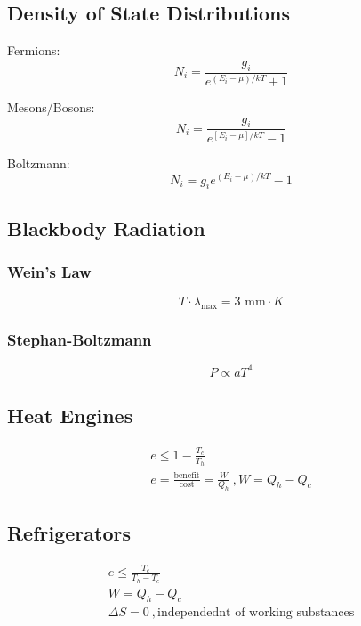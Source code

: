 \documentclass[10pt,a4paper]{article}
\begin{document}
\subsection{Density of State Distributions}
Fermions:
\begin{equation}
    N_i = \frac{g_i}{e^{(E_i - \mu)/kT}+1}
\end{equation}

Mesons/Bosons:
\begin{equation}
  N_i = \frac{g_i}{e^{[E_i - \mu]/kT} - 1}
\end{equation}

Boltzmann:
\begin{equation}
  N_i = {g_i}{e^{(E_i - \mu)/kT} - 1}
\end{equation}

\subsection{Blackbody Radiation}
\subsubsection{Wein's Law}
\begin{equation}
 T\cdot \lambda_{\textrm{max}} = 3\textrm{ mm}\cdot K
\end{equation}
\subsubsection{Stephan-Boltzmann}
\begin{equation}
 P \propto aT^4 
\end{equation}

\subsection{Heat Engines}
\begin{align}
 e \leq 1 - \frac{T_c}{T_h}\\
 e = \frac{\textrm{benefit}}{\textrm{cost}} = \frac{W}{Q_h}~,W = Q_h - Q_c
\end{align}

\subsection{Refrigerators}
\begin{align}
 e \leq \frac{T_c}{T_h - T_c}\\
 W = Q_h - Q_c\\
 \Delta S = 0~,\textrm{independednt of working substances}
\end{align}
\end{document}
